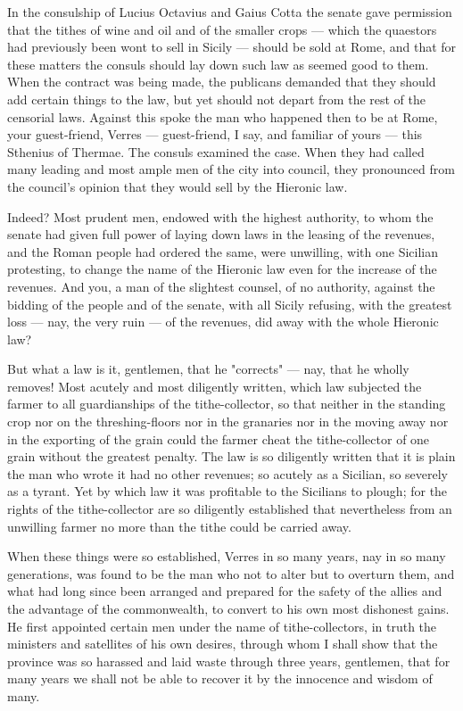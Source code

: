  In the consulship of Lucius Octavius and Gaius Cotta the senate gave permission that the tithes of wine and oil and of the smaller crops --- which the quaestors had previously been wont to sell in Sicily --- should be sold at Rome, and that for these matters the consuls should lay down such law as seemed good to them. When the contract was being made, the publicans demanded that they should add certain things to the law, but yet should not depart from the rest of the censorial laws. Against this spoke the man who happened then to be at Rome, your guest-friend, Verres --- guest-friend, I say, and familiar of yours --- this Sthenius of Thermae. The consuls examined the case. When they had called many leading and most ample men of the city into council, they pronounced from the council's opinion that they would sell by the Hieronic law.

 Indeed? Most prudent men, endowed with the highest authority, to whom the senate had given full power of laying down laws in the leasing of the revenues, and the Roman people had ordered the same, were unwilling, with one Sicilian protesting, to change the name of the Hieronic law even for the increase of the revenues. And you, a man of the slightest counsel, of no authority, against the bidding of the people and of the senate, with all Sicily refusing, with the greatest loss --- nay, the very ruin --- of the revenues, did away with the whole Hieronic law?

 But what a law is it, gentlemen, that he "corrects" --- nay, that he wholly removes! Most acutely and most diligently written, which law subjected the farmer to all guardianships of the tithe-collector, so that neither in the standing crop nor on the threshing-floors nor in the granaries nor in the moving away nor in the exporting of the grain could the farmer cheat the tithe-collector of one grain without the greatest penalty. The law is so diligently written that it is plain the man who wrote it had no other revenues; so acutely as a Sicilian, so severely as a tyrant. Yet by which law it was profitable to the Sicilians to plough; for the rights of the tithe-collector are so diligently established that nevertheless from an unwilling farmer no more than the tithe could be carried away.

 When these things were so established, Verres in so many years, nay in so many generations, was found to be the man who not to alter but to overturn them, and what had long since been arranged and prepared for the safety of the allies and the advantage of the commonwealth, to convert to his own most dishonest gains. He first appointed certain men under the name of tithe-collectors, in truth the ministers and satellites of his own desires, through whom I shall show that the province was so harassed and laid waste through three years, gentlemen, that for many years we shall not be able to recover it by the innocence and wisdom of many.

